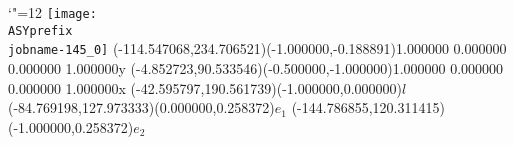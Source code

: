 \setlength{\unitlength}{1pt}%
\makeatletter%
\let\ASYencoding\f@encoding%
\let\ASYfamily\f@family%
\let\ASYseries\f@series%
\let\ASYshape\f@shape%
\makeatother%
{\catcode`"=12%
\texttt{[image: \\ASYprefix\\jobname-145\_0]}%
}%
\color{ASYcolor}%
\fontsize{12.000000}{14.400000}\selectfont%
\usefont{\ASYencoding}{\ASYfamily}{\ASYseries}{\ASYshape}%
\ASYalignT(-114.547068,234.706521)(-1.000000,-0.188891){1.000000 0.000000 0.000000 1.000000}{y}%
\color{ASYcolor}%
\fontsize{12.000000}{14.400000}\selectfont%
\ASYalignT(-4.852723,90.533546)(-0.500000,-1.000000){1.000000 0.000000 0.000000 1.000000}{x}%
\color{ASYcolor}%
\fontsize{12.000000}{14.400000}\selectfont%
\ASYalign(-42.595797,190.561739)(-1.000000,0.000000){$l$}%
\color{ASYcolor}%
\fontsize{12.000000}{14.400000}\selectfont%
\ASYalign(-84.769198,127.973333)(0.000000,0.258372){$e_1$}%
\color{ASYcolor}%
\fontsize{12.000000}{14.400000}\selectfont%
\ASYalign(-144.786855,120.311415)(-1.000000,0.258372){$e_2$}%
